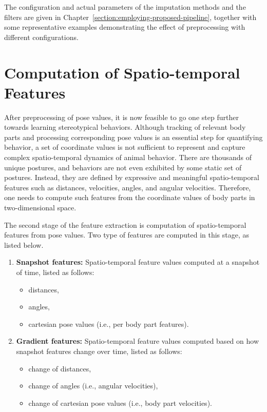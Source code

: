 The configuration and actual parameters of the imputation methods and the filters are given in Chapter~\ref{section:employing-proposed-pipeline}, together with some representative examples demonstrating the effect of preprocessing with different configurations.

\section{Computation of Spatio-temporal Features}
After preprocessing of pose values, it is now feasible to go one step further towards learning stereotypical behaviors.
Although tracking of relevant body parts and processing corresponding pose values is an essential step for quantifying behavior, a set of coordinate values is not sufficient to represent and capture complex spatio-temporal dynamics of animal behavior.
There are thousands of unique postures, and behaviors are not even exhibited by some static set of postures.
Instead, they are defined by expressive and meaningful spatio-temporal features such as distances, velocities, angles, and angular velocities.
Therefore, one needs to compute such features from the coordinate values of body parts in two-dimensional space.

The second stage of the feature extraction is computation of spatio-temporal features from pose values. Two type of features are computed in this stage, as listed below.
\begin{enumerate}
	\item \textbf{Snapshot features:} Spatio-temporal feature values computed at a snapshot of time, listed as follows:
	      \begin{itemize}
		      \item distances,
		      \item angles,
		      \item cartesian pose values (i.e., per body part features).
	      \end{itemize}
	\item \textbf{Gradient features:} Spatio-temporal feature values computed based on how snapshot features change over time, listed as follows:
	      \begin{itemize}
		      \item change of distances,
		      \item change of angles (i.e., angular velocities),
		      \item change of cartesian pose values (i.e., body part velocities).
	      \end{itemize}
\end{enumerate}

